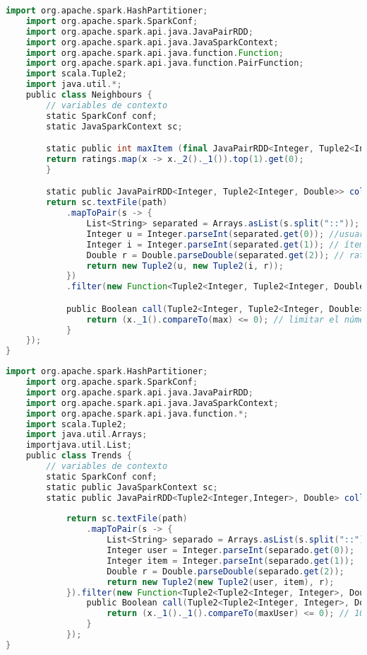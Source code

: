 \begin{lstlisting}[language=Scala, caption={Class K Neigborhoods},label=kneigh]
    import org.apache.spark.HashPartitioner;
    import org.apache.spark.SparkConf;
    import org.apache.spark.api.java.JavaPairRDD;
    import org.apache.spark.api.java.JavaSparkContext;
    import org.apache.spark.api.java.function.Function;
    import org.apache.spark.api.java.function.PairFunction;
    import scala.Tuple2;
    import java.util.*;
    public class Neighbours {
        // variables de contexto
        static SparkConf conf;
        static JavaSparkContext sc;

        static public int maxItem (final JavaPairRDD<Integer, Tuple2<Integer, Double>> ratings) {
        return ratings.map(x -> x._2()._1()).top(1).get(0);
        }

        static public JavaPairRDD<Integer, Tuple2<Integer, Double>> collectData(String path, final Integer max){
        return sc.textFile(path)
            .mapToPair(s -> {
                List<String> separated = Arrays.asList(s.split("::"));
                Integer u = Integer.parseInt(separated.get(0)); //usuario
                Integer i = Integer.parseInt(separated.get(1)); // ítem
                Double r = Double.parseDouble(separated.get(2)); // rating
                return new Tuple2(u, new Tuple2(i, r));
            })
            .filter(new Function<Tuple2<Integer, Tuple2<Integer, Double>>, Boolean>() {

            public Boolean call(Tuple2<Integer, Tuple2<Integer, Double>> x) {
                return (x._1().compareTo(max) <= 0); // limitar el número de usuarios
            }   
    });
}


\end{lstlisting}

\newpage
\begin{lstlisting}[language=Scala, caption={Class Trends},label=trends]
    import org.apache.spark.HashPartitioner;
    import org.apache.spark.SparkConf;
    import org.apache.spark.api.java.JavaPairRDD;
    import org.apache.spark.api.java.JavaSparkContext;
    import org.apache.spark.api.java.function.*;
    import scala.Tuple2;
    import java.util.Arrays;
    importjava.util.List;
    public class Trends {
        // variables de contexto
        static SparkConf conf;
        static public JavaSparkContext sc;
        static public JavaPairRDD<Tuple2<Integer,Integer>, Double> collectData(String path, final Integer maxUser){ 
      
            return sc.textFile(path)
                .mapToPair(s -> {
                    List<String> separado = Arrays.asList(s.split("::"));
                    Integer user = Integer.parseInt(separado.get(0));
                    Integer item = Integer.parseInt(separado.get(1));
                    Double r = Double.parseDouble(separado.get(2));
                    return new Tuple2(new Tuple2(user, item), r);
            }).filter(new Function<Tuple2<Tuple2<Integer, Integer>, Double>, Boolean>() {
                public Boolean call(Tuple2<Tuple2<Integer, Integer>, Double> x) {
                    return (x._1()._1().compareTo(maxUser) <= 0); // 1000 usuarios
                }
            });
}
\end{lstlisting}

